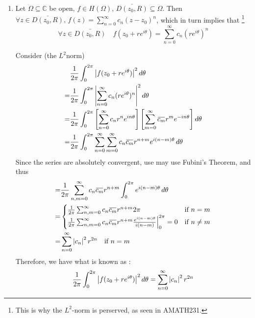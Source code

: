 \documentclass[11pt, oneside]{book}
\begin{document}
\begin{ex}
\begin{enumerate}
		\item {} Let $\Omega \subseteq \mathbb{C}$ be open, $f \in H(\Omega), \, \bar{D(z_0, R)} \subseteq \Omega$. Then $\forall z \in \bar{D(z_0, R)}, \, f(z) = \sum_{n=0}^{\infty} c_n (z - z_0)^n$, which in turn implies that \footnote{This is why the $L^2$-norm is perserved, as seen in AMATH231.}\label{item:parseval_s_theorem}
		\begin{equation*}\tag{$\dagger$}\label{eq:parseval_s_l2_norm}
			\forall z \in \bar{D(z_0, R)} \quad f(z_0 + re^{i \theta}) = \sum_{n=0}^{\infty} c_n (re^{i \theta})^n
		\end{equation*}

			Consider (the $L^2$norm)
			\begin{align*}
				& \frac{1}{2 \pi} \int_{0}^{2 \pi} \abs{f(z_0 + re^{i \theta})}^2 \dif{\theta} \\
				=&\frac{1}{2 \pi} \int_{0}^{2 \pi} \abs{\sum_{n=0}^{\infty} c_n (re^{i \theta})^n}^2 \dif{\theta} \\
				=& \frac{1}{2 \pi} \int_{0}^{2 \pi} \left[ \sum_{n=0}^{\infty} c_n r^n e^{i n \theta} \right] \left[\sum_{m=0}^{\infty} \bar{c_m} r^m e^{-i n \theta} \right] \dif{\theta} \\
				=& \frac{1}{2 \pi} \int_{0}^{2 \pi} \sum_{n=0}^{\infty} \sum_{m=0}^{\infty} c_n \bar{c_m} r^{n + m} e^{i (n - m) \theta} \dif{\theta} 
			\end{align*}
			Since the series are absolutely convergent, use may use Fubini's Theorem, and thus
			\begin{align*}
				=& \frac{1}{2 \pi} \sum_{n,m = 0}^{\infty} c_n \bar{c_m} r^{n + m} \int_{0}^{2 \pi} e^{i (n - m) \theta} \dif{\theta} \\
				=& \begin{cases}
					\frac{1}{2 \pi} \sum_{n,m = 0}^{\infty} c_n \bar{c_m} r^{n + m} 2 \pi & \text{if } n = m \\
					\frac{1}{2 \pi} \sum_{n,m = 0}^{\infty} c_n \bar{c_m} r^{n + m} \frac{e^{i (n - m) \theta}}{i (n - m)} \at{0}{2 \pi} = 0 & \text{if } n \neq m
				\end{cases} \\
				=& \sum_{n=0}^{\infty} \abs{c_n}^2 r^{2n} \quad \text{if } n = m
			\end{align*}
			Therefore, we have what is known as :
			\begin{equation}\label{eq:parseval_s_identity}
				\frac{1}{2 \pi} \int_{0}^{2 \pi} \left|f(z_0 + re^{i \theta})\right|^2 \mathop{}\!d{\theta} = \sum_{n=0}^{\infty} \left|c_n\right|^2 r^{2n}
			\end{equation}


\end{enumerate}
\end{ex}
\end{document}
